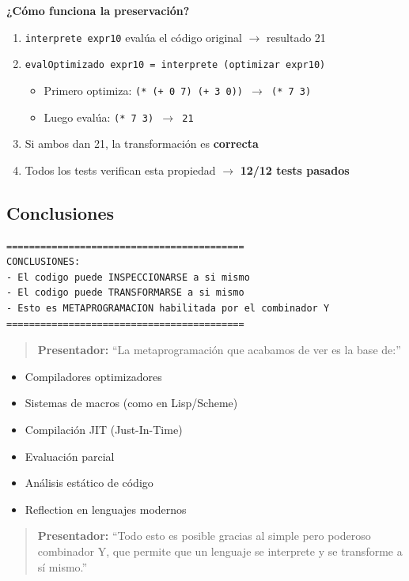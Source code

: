 \documentclass[12pt]{article}
\begin{document}
\textbf{¿Cómo funciona la preservación?}
\begin{enumerate}
\item \texttt{interprete expr10} evalúa el código original $\rightarrow$ resultado 21
\item \texttt{evalOptimizado expr10 = interprete (optimizar expr10)}
\begin{itemize}
\item Primero optimiza: \texttt{(* (+ 0 7) (+ 3 0)) $\rightarrow$ (* 7 3)}
\item Luego evalúa: \texttt{(* 7 3) $\rightarrow$ 21}
\end{itemize}
\item Si ambos dan 21, la transformación es \textbf{correcta}
\item Todos los tests verifican esta propiedad $\rightarrow$ \textbf{12/12 tests pasados}
\end{enumerate}

\subsection*{Conclusiones}

\begin{verbatim}
==========================================
CONCLUSIONES:
- El codigo puede INSPECCIONARSE a si mismo
- El codigo puede TRANSFORMARSE a si mismo
- Esto es METAPROGRAMACION habilitada por el combinador Y
==========================================
\end{verbatim}

\begin{quote}
\textbf{Presentador:} ``La metaprogramación que acabamos de ver es la base de:''
\end{quote}

\begin{itemize}
\item Compiladores optimizadores
\item Sistemas de macros (como en Lisp/Scheme)
\item Compilación JIT (Just-In-Time)
\item Evaluación parcial
\item Análisis estático de código
\item Reflection en lenguajes modernos
\end{itemize}

\begin{quote}
\textbf{Presentador:} ``Todo esto es posible gracias al simple pero poderoso combinador Y, que permite que un lenguaje se interprete y se transforme a sí mismo.''
\end{quote}
\end{document}
